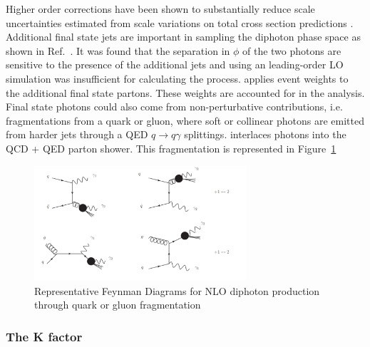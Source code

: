Higher order corrections have been shown to substantially reduce scale uncertainties estimated from scale variations on total cross section predictions \cite{Badger:2013ava}. Additional final state jets are important in sampling the diphoton phase space as shown in Ref.~\cite{CMS-PAS-EXO-12-045}. It was found that the separation in $\phi$ of the two photons are sensitive to the presence of the additional jets and using an leading-order LO simulation was insufficient for calculating the process. \SHERPA applies event weights to the additional final state partons. These weights are accounted for in the analysis. Final state photons could also come from non-perturbative contributions, i.e. fragmentations from a quark or gluon, where soft or collinear photons are emitted from harder jets through a QED $q\longrightarrow q\gamma$ splittings. \SHERPA interlaces photons into the QCD + QED parton shower. This fragmentation is represented in Figure~\ref{fig:NLOSMBackgroundFragmentation}


\begin{figure}[htbp!]
\caption{Representative Feynman Diagrams for NLO diphoton production through quark or gluon fragmentation \cite{DErrico:2011cgc}}
\begin{center}
\includegraphics[angle=0,width=0.7\textwidth]{fig/GluonOrQuarkFragmentation.png}
\end{center}
\label{fig:NLOSMBackgroundFragmentation}
\end{figure}

\subsubsection{The K factor}

